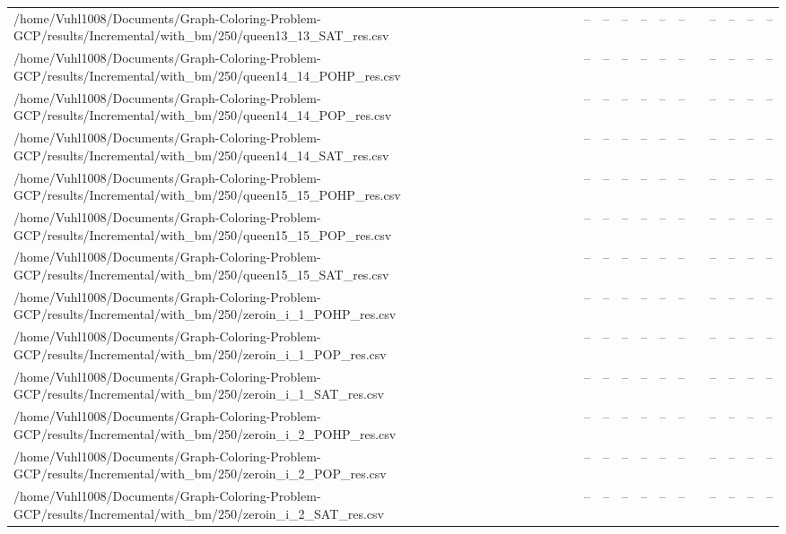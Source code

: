 \begin{table}[htbp]
\begin{tabular}{llllllllllll}
/home/Vuhl1008/Documents/Graph-Coloring-Problem-GCP/results/Incremental/with\_bm/250/queen13\_13\_SAT\_res.csv & -- & -- & -- & -- & -- & -- & {} & -- & -- & -- & -- \\
/home/Vuhl1008/Documents/Graph-Coloring-Problem-GCP/results/Incremental/with\_bm/250/queen14\_14\_POHP\_res.csv & -- & -- & -- & -- & -- & -- & {} & -- & -- & -- & -- \\
/home/Vuhl1008/Documents/Graph-Coloring-Problem-GCP/results/Incremental/with\_bm/250/queen14\_14\_POP\_res.csv & -- & -- & -- & -- & -- & -- & {} & -- & -- & -- & -- \\
/home/Vuhl1008/Documents/Graph-Coloring-Problem-GCP/results/Incremental/with\_bm/250/queen14\_14\_SAT\_res.csv & -- & -- & -- & -- & -- & -- & {} & -- & -- & -- & -- \\
/home/Vuhl1008/Documents/Graph-Coloring-Problem-GCP/results/Incremental/with\_bm/250/queen15\_15\_POHP\_res.csv & -- & -- & -- & -- & -- & -- & {} & -- & -- & -- & -- \\
/home/Vuhl1008/Documents/Graph-Coloring-Problem-GCP/results/Incremental/with\_bm/250/queen15\_15\_POP\_res.csv & -- & -- & -- & -- & -- & -- & {} & -- & -- & -- & -- \\
/home/Vuhl1008/Documents/Graph-Coloring-Problem-GCP/results/Incremental/with\_bm/250/queen15\_15\_SAT\_res.csv & -- & -- & -- & -- & -- & -- & {} & -- & -- & -- & -- \\
/home/Vuhl1008/Documents/Graph-Coloring-Problem-GCP/results/Incremental/with\_bm/250/zeroin\_i\_1\_POHP\_res.csv & -- & -- & -- & -- & -- & -- & {} & -- & -- & -- & -- \\
/home/Vuhl1008/Documents/Graph-Coloring-Problem-GCP/results/Incremental/with\_bm/250/zeroin\_i\_1\_POP\_res.csv & -- & -- & -- & -- & -- & -- & {} & -- & -- & -- & -- \\
/home/Vuhl1008/Documents/Graph-Coloring-Problem-GCP/results/Incremental/with\_bm/250/zeroin\_i\_1\_SAT\_res.csv & -- & -- & -- & -- & -- & -- & {} & -- & -- & -- & -- \\
/home/Vuhl1008/Documents/Graph-Coloring-Problem-GCP/results/Incremental/with\_bm/250/zeroin\_i\_2\_POHP\_res.csv & -- & -- & -- & -- & -- & -- & {} & -- & -- & -- & -- \\
/home/Vuhl1008/Documents/Graph-Coloring-Problem-GCP/results/Incremental/with\_bm/250/zeroin\_i\_2\_POP\_res.csv & -- & -- & -- & -- & -- & -- & {} & -- & -- & -- & -- \\
/home/Vuhl1008/Documents/Graph-Coloring-Problem-GCP/results/Incremental/with\_bm/250/zeroin\_i\_2\_SAT\_res.csv & -- & -- & -- & -- & -- & -- & {} & -- & -- & -- & -- \\

\end{tabular}
\end{table}
